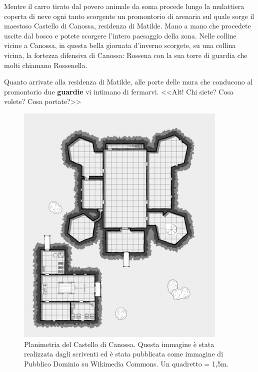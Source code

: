 \documentclass[letterpaper,twocolumn,openany,nodeprecatedcode]{dndbook}
\begin{document}
\begin{DndReadAloud}
Mentre il carro tirato dal povero animale da soma procede lungo la mulattiera coperta di neve ogni tanto scorgente un promontorio di arenaria sul quale sorge il maestoso Castello di Canossa, residenza di Matilde. Mano a mano che procedete uscite dal bosco e potete scorgere l'intero paesaggio della zona. Nelle colline vicine a Canossa, in questa bella giornata d'inverno scorgete, su una collina vicina, la fortezza difensiva di Canossa: Rossena con la sua torre di guardia che molti chiamano Rossenella.

Quanto arrivate alla residenza di Matilde, alle porte delle mura che conducono al promontorio due \textbf{guardie} vi intimano di fermarvi. <<Alt! Chi siete? Cosa volete? Cosa portate?>>
\end{DndReadAloud}

\begin{figure}
\centering
\includegraphics[width=0.9\textwidth]{img/canossa.png}
\caption{Planimetria del Castello di Canossa. Questa immagine è stata realizzata dagli scriventi ed è stata pubblicata come immagine di Pubblico Dominio su Wikimedia Commons. Un quadretto = 1,5m.}
\label{cansossa-map}
\end{figure}
\end{document}
